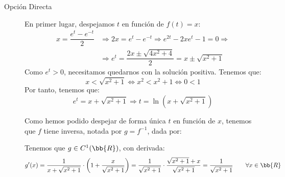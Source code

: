 \documentclass[12pt]{article}
\begin{document}
\begin{ejercicio}
\begin{description}
            \item[Opción Directa]
            
            En primer lugar, despejamos $t$ en función de $f(t)=x$:
            \begin{align*}
                x=\dfrac{e^t - e^{-t}}{2} &\Longrightarrow 2x = e^t - e^{-t} \Longrightarrow e^{2t} - 2xe^t - 1 = 0
                \Longrightarrow \\& \Longrightarrow e^t = \dfrac{2x\pm \sqrt{4x^2+4}}{2} = x\pm \sqrt{x^2+1}
            \end{align*}
            Como $e^t>0$, necesitamos quedarnos con la solución positiva. Tenemos que:
            \begin{equation*}
                x<\sqrt{x^2+1} \Longleftrightarrow
                x^2<x^2+1 \Longleftrightarrow
                0<1
            \end{equation*}
            Por tanto, tenemos que:
            \begin{equation*}
                e^t = x + \sqrt{x^2+1} \Longrightarrow t = \ln(x + \sqrt{x^2+1})
            \end{equation*}

            Como hemos podido despejar de forma única $t$ en función de $x$, tenemos que $f$ tiene inversa, notada por $g=f^{-1}$, dada por:

            Tenemos que $g\in C^1(\bb{R})$, con derivada:
            \begin{equation*}
                g'(x) = \dfrac{1}{x + \sqrt{x^2+1}}\cdot \left(1 + \dfrac{x}{\sqrt{x^2+1}}\right) = \dfrac{1}{\sqrt{x^2+1}}\cdot \dfrac{\sqrt{x^2+1}+x}{\sqrt{x^2+1}} = \dfrac{1}{\sqrt{x^2+1}} \qquad \forall x\in \bb{R}
            \end{equation*}
        \end{description}
        
    \end{ejercicio}
\end{document}
